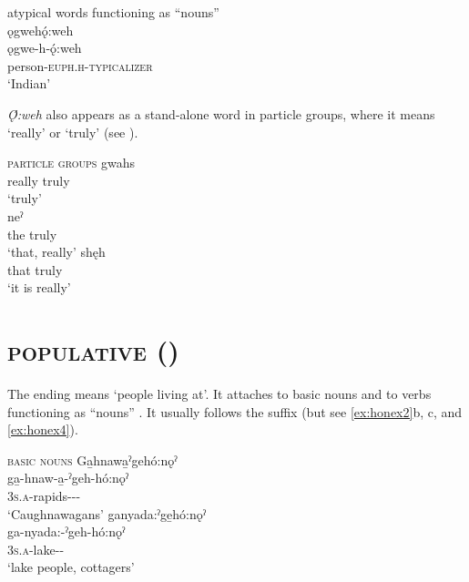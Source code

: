 \z
\z

\ea\label{ex:oweh2}atypical words functioning as “nouns”\\
ǫgwehǫ́:weh\\
\gll ǫgwe-h-ǫ́:weh\\
 person-\textsc{euph.h-typicalizer}\\
\glt `Indian'
\z


\textit{Ǫ́:weh} also appears as a stand-alone word in particle groups, where it means ‘really’ or ‘truly’ (see ).

\ea\label{ex:oweh4} \textsc{particle groups}
\ea 
\gll gwahs \\
really truly\\
\glt  ‘truly’\\

\ex 
\gll neˀ \\
the truly \\
\glt ‘that, really’
\ex 
\gll shęh   \\
that truly\\
\glt ‘it is really’
\z
\z

\newpage
\section{ \textsc{populative} \textup{(}{\populative}\textup{)}} \label{-ho:nǫˀ}
The  \textsc{\populative} ending means ‘people living at’. It attaches to basic nouns  and to verbs functioning as “nouns” . It usually follows the  {\on} suffix (but see \ref{ex:honex2}b, c, and \ref{ex:honex4}).

\ea\label{ex:honex} \textsc{basic nouns}
\ea Ga̱hnawa̱ˀgehó:nǫˀ\\
\gll ga̱-hnaw-a̱-ˀgeh-hó:nǫˀ\\
 \textsc{3s.a}-rapids-{\joinerA}-{\on}-{\populative}\\
\glt `Caughnawagans'
\ex ganyada:ˀge̱hó:nǫˀ\\
\gll ga-nyada:-ˀgeh-hó:nǫˀ\\
 \textsc{3s.a}-lake-{\on}-{\populative}\\
\glt `lake people, cottagers'

